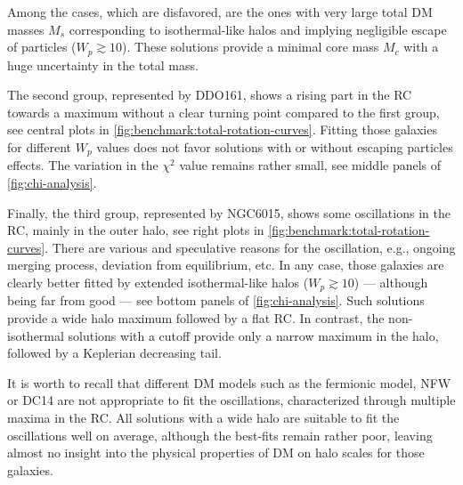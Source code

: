 Among the cases, which are disfavored, are the ones with very large total DM masses $M_s$ corresponding to isothermal-like halos and implying negligible escape of particles ($W_p \gtrsim 10$). These solutions provide a minimal core mass $M_c$ with a huge uncertainty in the total mass. %

The second group, represented by DDO161, shows a rising part in the RC towards a maximum without a clear turning point compared to the first group, see central plots in \cref{fig:benchmark:total-rotation-curves}. Fitting those galaxies for different $W_p$ values does not favor solutions with or without escaping particles effects. The variation in the $\chi^2$ value remains rather small, see middle panels of \cref{fig:chi-analysis}.


Finally, the third group, represented by NGC6015, shows some oscillations in the RC, mainly in the outer halo, see right plots in \cref{fig:benchmark:total-rotation-curves}. There are various and speculative reasons for the oscillation, e.g., ongoing merging process, deviation from equilibrium, etc. In any case, those galaxies are clearly better fitted by extended isothermal-like halos ($W_p \gtrsim 10$) --- although being far from good --- see bottom panels of \cref{fig:chi-analysis}. Such solutions provide a wide halo maximum followed by a flat RC. In contrast, the non-isothermal solutions with a cutoff provide only a narrow maximum in the halo, followed by a Keplerian decreasing tail.

It is worth to recall that different DM models such as the fermionic model, NFW or DC14 are not appropriate to fit the oscillations, characterized through multiple maxima in the RC. All solutions with a wide halo are suitable to fit the oscillations well on average, although the best-fits remain rather poor, leaving almost no insight into the physical properties of DM on halo scales for those galaxies.
